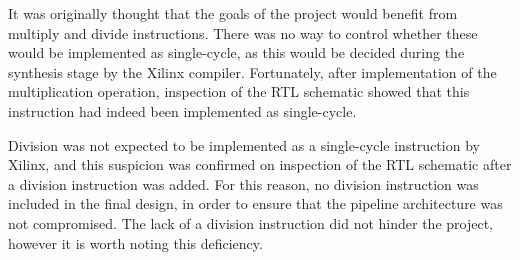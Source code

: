 It was originally thought that the goals of the project would benefit from
multiply and divide instructions. There was no way to control whether these
would be implemented as single-cycle, as this would be decided during the
synthesis stage by the Xilinx compiler. Fortunately, after implementation of the
multiplication operation, inspection of the RTL schematic showed that this
instruction had indeed been implemented as single-cycle.

Division was not expected to be implemented as a single-cycle instruction by
Xilinx, and this suspicion was confirmed on inspection of the RTL schematic
after a division instruction was added. For this reason, no division instruction
was included in the final design, in order to ensure that the pipeline
architecture was not compromised. The lack of a division instruction did not
hinder the project, however it is worth noting this deficiency.
